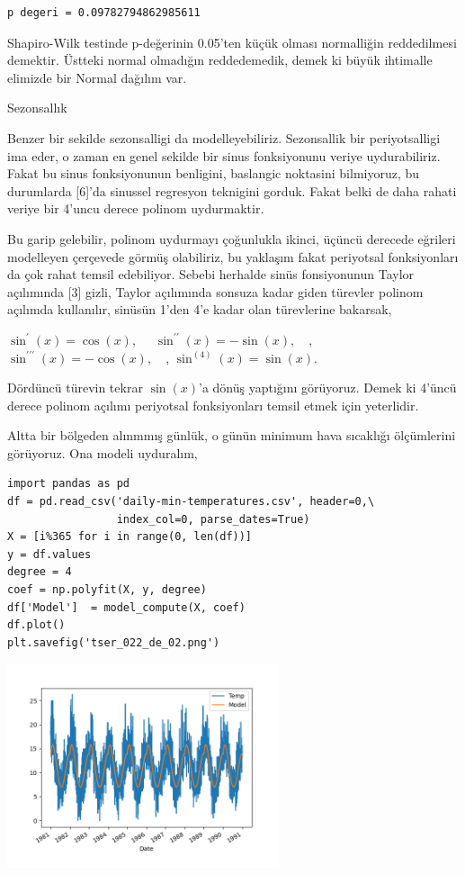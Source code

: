 \documentclass[12pt,fleqn]{article}\usepackage{../../common}
\begin{document}
\begin{verbatim}
p degeri = 0.09782794862985611
\end{verbatim}

Shapiro-Wilk testinde p-değerinin 0.05'ten küçük olması normalliğin reddedilmesi
demektir. Üstteki normal olmadığın reddedemedik, demek ki büyük ihtimalle
elimizde bir Normal dağılım var.

Sezonsallık

Benzer bir sekilde sezonsalligi da modelleyebiliriz. Sezonsallik bir
periyotsalligi ima eder, o zaman en genel sekilde bir sinus fonksiyonunu veriye
uydurabiliriz. Fakat bu sinus fonksiyonunun benligini, baslangic noktasini
bilmiyoruz, bu durumlarda [6]'da sinussel regresyon teknigini gorduk. Fakat
belki de daha rahati veriye bir 4'uncu derece polinom uydurmaktir.

Bu garip gelebilir, polinom uydurmayı çoğunlukla ikinci, üçüncü derecede
eğrileri modelleyen çerçevede görmüş olabiliriz, bu yaklaşım fakat periyotsal
fonksiyonları da çok rahat temsil edebiliyor. Sebebi herhalde sinüs fonsiyonunun
Taylor açılımında [3] gizli, Taylor açılımında sonsuza kadar giden türevler
polinom açılımda kullanılır, sinüsün 1'den 4'e kadar olan türevlerine bakarsak,

$\sin^{\prime}(x)=\cos(x),\quad$
$\sin^{\prime\prime}(x)=-\sin(x),\quad$,
$\sin^{\prime\prime\prime}(x)=-\cos(x),\quad$,
$\sin^{(4)}(x)=\sin(x)$.

Dördüncü türevin tekrar $\sin(x)$'a dönüş yaptığını görüyoruz. Demek ki 4'üncü
derece polinom açılımı periyotsal fonksiyonları temsil etmek için yeterlidir.

Altta bir bölgeden alınmmış günlük, o günün minimum hava sıcaklığı ölçümlerini
görüyoruz. Ona modeli uyduralım,

\begin{verbatim}
import pandas as pd
df = pd.read_csv('daily-min-temperatures.csv', header=0,\
                 index_col=0, parse_dates=True)
X = [i%365 for i in range(0, len(df))]
y = df.values
degree = 4
coef = np.polyfit(X, y, degree)
df['Model']  = model_compute(X, coef)
df.plot()
plt.savefig('tser_022_de_02.png')
\end{verbatim}

\includegraphics[height=6cm]{tser_022_de_02.png}
\end{document}
